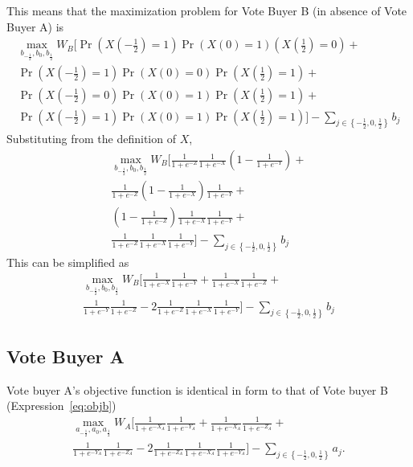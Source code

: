 \documentclass[12pt]{article}
\begin{document}
This means that the maximization problem for Vote Buyer B (in absence of Vote Buyer A) is
			  \begin{multline}
			    \max_{b_{-\frac{1}{2}}, b_0, b_{\frac{1}{2}}} 
					W_B \biggl[ \Pr\left(X\left(-\frac{1}{2}\right)=1\right)\Pr\left(X\left(0\right)=1\right)\left(X\left(\frac{1}{2}\right)=0\right)  + \\
					\Pr\left(X\left(-\frac{1}{2}\right)=1\right)\Pr\left(X\left(0\right)=0\right)\Pr\left(X\left(\frac{1}{2}\right)=1\right) + \\
					\Pr\left(X\left(-\frac{1}{2}\right)=0\right)\Pr\left(X\left(0\right)=1\right)\Pr\left(X\left(\frac{1}{2}\right)=1\right) + \\
					\Pr\left(X\left(-\frac{1}{2}\right)=1\right)\Pr\left(X\left(0\right)=1\right)\Pr\left(X\left(\frac{1}{2}\right)=1\right) \biggr] - \sum_{j\in \left\{-\frac{1}{2}, 0,\frac{1}{2}\right\}} b_j
				\end{multline}
			Substituting from the definition of $X$,
			  \begin{multline}
			    \max_{b_{-\frac{1}{2}}, b_0, b_{\frac{1}{2}}} 
					W_B \biggl[ \frac{1}{1+e^{-Z}} \frac{1}{1+e^{-X}} \left(1-\frac{1}{1+e^{-Y}}\right)  + \\
					\frac{1}{1+e^{-Z}} \left(1-\frac{1}{1+e^{-X}}\right) \frac{1}{1+e^{-Y}} + \\
					\left(1-\frac{1}{1+e^{-Z}} \right) \frac{1}{1+e^{-X}} \frac{1}{1+e^{-Y}} + \\
					\frac{1}{1+e^{-Z}} \frac{1}{1+e^{-X}} \frac{1}{1+e^{-Y}} \biggr] - \sum_{j\in \left\{-\frac{1}{2}, 0,\frac{1}{2}\right\}} b_j
				\end{multline}
			This can be simplified as 
			  \begin{multline}
			    \max_{b_{-\frac{1}{2}}, b_0, b_{\frac{1}{2}}} 
					W_B \biggl[ \frac{1}{1+e^{-X}} \frac{1}{1+e^{-Y}} +
					\frac{1}{1+e^{-X}} \frac{1}{1+e^{-Z}} + \\
					\frac{1}{1+e^{-Y}} \frac{1}{1+e^{-Z}} - 2	\frac{1}{1+e^{-Z}} \frac{1}{1+e^{-X}} \frac{1}{1+e^{-Y}} \biggr] - \sum_{j\in \left\{-\frac{1}{2}, 0,\frac{1}{2}\right\}} b_j
					\label{eq:objb}
				\end{multline}
		
\subsection{Vote Buyer A}
Vote buyer A's objective function is identical in form to that of Vote buyer B (Expression~\ref{eq:objb}) 
			  \begin{multline}
			    \max_{a_{-\frac{1}{2}}, a_0, a_{\frac{1}{2}}} 
					W_A \biggl[ \frac{1}{1+e^{-X_A}} \frac{1}{1+e^{-Y_A}} +
					\frac{1}{1+e^{-X_A}} \frac{1}{1+e^{-Z_A}} + \\
					\frac{1}{1+e^{-Y_A}} \frac{1}{1+e^{-Z_A}} - 2	\frac{1}{1+e^{-Z_A}} \frac{1}{1+e^{-X_A}} \frac{1}{1+e^{-Y_A}} \biggr] - \sum_{j\in \left\{-\frac{1}{2}, 0,\frac{1}{2}\right\}} a_j .
					\label{eq:obja}
				\end{multline}
\end{document}
